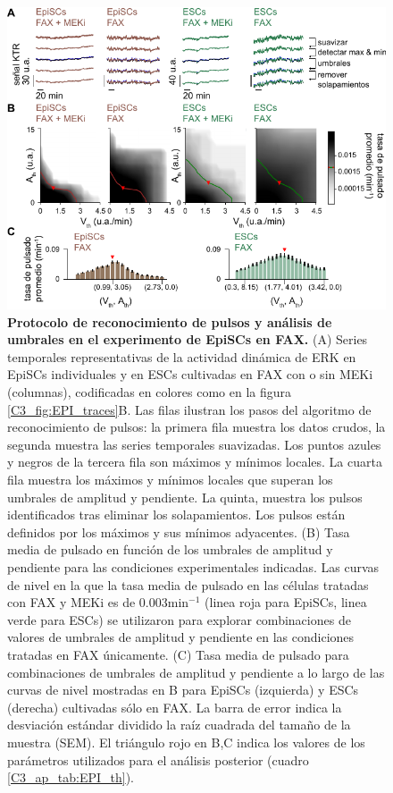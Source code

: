 \documentclass[./main.tex]{subfiles}
\begin{document}
\begin{subappendices}
\begin{figure}
    \centering
    \includegraphics[width=1\columnwidth]{figures/chapter3/C3_EpiSC_pulse_detection.pdf}\caption{\textbf{Protocolo de reconocimiento de pulsos y análisis de umbrales en el experimento de EpiSCs en FAX.} 
    (A) Series temporales representativas de la actividad dinámica de ERK en EpiSCs individuales y en ESCs cultivadas en FAX con o sin MEKi (columnas), codificadas en colores como en la figura \ref{C3_fig:EPI_traces}B. Las filas ilustran los pasos del algoritmo de reconocimiento de pulsos: la primera fila muestra los datos crudos, la segunda muestra las series temporales suavizadas. Los puntos azules y negros de la tercera fila son máximos y mínimos locales. La cuarta fila muestra los máximos y mínimos locales que superan los umbrales de amplitud y pendiente. La quinta, muestra los pulsos identificados tras eliminar los solapamientos. Los pulsos están definidos por los máximos y sus mínimos adyacentes. (B) Tasa media de pulsado en función de los umbrales de amplitud y pendiente para las condiciones experimentales indicadas. Las curvas de nivel en la que la tasa media de pulsado en las células tratadas con FAX y MEKi es de $0.003 \text{min}^{-1}$ (linea roja para EpiSCs, linea verde para ESCs) se utilizaron para explorar combinaciones de valores de umbrales de amplitud y pendiente en las condiciones tratadas en FAX únicamente. (C) Tasa media de pulsado para combinaciones de umbrales de amplitud y pendiente a lo largo de las curvas de nivel mostradas en B para EpiSCs (izquierda) y ESCs (derecha) cultivadas sólo en FAX. La barra de error indica la desviación estándar dividido la raíz cuadrada del tamaño de la muestra (SEM). El triángulo rojo en B,C indica los valores de los parámetros utilizados para el análisis posterior (cuadro \ref{C3_ap_tab:EPI_th}).}
    \label{C3_ap_fig:EPI_pulse_detection}
\end{figure}


\end{subappendices}
\end{document}
